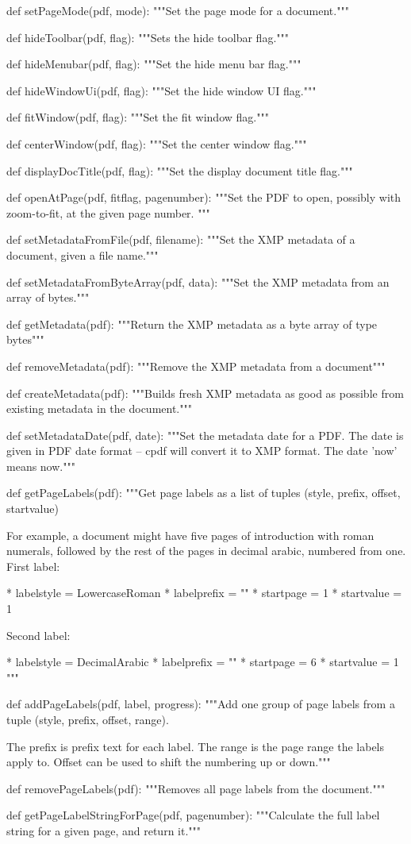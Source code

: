 def setPageMode(pdf, mode):
    """Set the page mode for a document."""

def hideToolbar(pdf, flag):
    """Sets the hide toolbar flag."""

def hideMenubar(pdf, flag):
    """Set the hide menu bar flag."""

def hideWindowUi(pdf, flag):
    """Set the hide window UI flag."""

def fitWindow(pdf, flag):
    """Set the fit window flag."""

def centerWindow(pdf, flag):
    """Set the center window flag."""

def displayDocTitle(pdf, flag):
    """Set the display document title flag."""

def openAtPage(pdf, fitflag, pagenumber):
    """Set the PDF to open, possibly with zoom-to-fit, at the given page
    number. """

def setMetadataFromFile(pdf, filename):
    """Set the XMP metadata of a document, given a file name."""

def setMetadataFromByteArray(pdf, data):
    """Set the XMP metadata from an array of bytes."""

def getMetadata(pdf):
    """Return the XMP metadata as a byte array of type bytes"""

def removeMetadata(pdf):
    """Remove the XMP metadata from a document"""

def createMetadata(pdf):
    """Builds fresh XMP metadata as good as possible from existing
    metadata in the document."""

def setMetadataDate(pdf, date):
    """Set the metadata date for a PDF. The date is given in PDF date format --
    cpdf will convert it to XMP format. The date 'now' means now."""

def getPageLabels(pdf):
    """Get page labels as a list of tuples (style, prefix, offset, startvalue)

    For example, a document might have five pages of introduction with roman
    numerals, followed by the rest of the pages in decimal arabic, numbered
    from one. First label:

    * labelstyle = LowercaseRoman
    * labelprefix = ""
    * startpage = 1
    * startvalue = 1

    Second label:

    * labelstyle = DecimalArabic
    * labelprefix = ""
    * startpage = 6
    * startvalue = 1 """

def addPageLabels(pdf, label, progress):
    """Add one group of page labels from a tuple (style, prefix, offset, range).

    The prefix is prefix text for each label. The range is the page range the
    labels apply to. Offset can be used to shift the numbering up or down."""

def removePageLabels(pdf):
    """Removes all page labels from the document."""

def getPageLabelStringForPage(pdf, pagenumber):
    """Calculate the full label string for a given page, and return it."""
